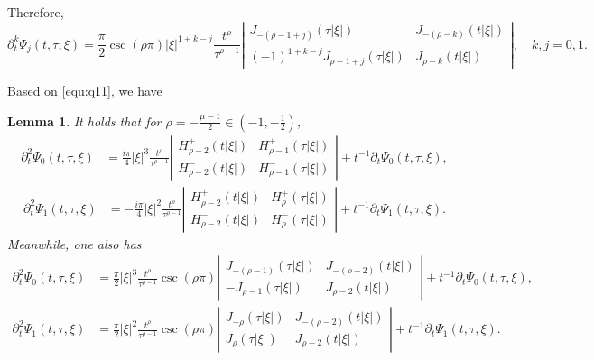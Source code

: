 \documentclass[11pt,twoside]{article}
\newcommand{\p}{\partial}
\newcommand{\f}{\frac}
\theoremstyle{plain}
\newtheorem{lemma}[theorem]{Lemma}
\theoremstyle{definition}
\theoremstyle{remark}
\numberwithin{equation}{section}
\begin{document}
Therefore,
\begin{equation}\label{equ:q11}
\partial_{t}^{k} \Psi_{j}(t, \tau, \xi)=\frac{\pi}{2} \csc  (\rho \pi)|\xi|^{1+k-j} \frac{t^{\rho}}{\tau^{\rho-1}}
 \left|\begin{array}{cc}
J_{-(\rho-1+j)}(\tau|\xi|) & J_{-(\rho-k)}(t|\xi|) \\
(-1)^{1+k-j} J_{\rho-1+j}(\tau|\xi|) & J_{\rho-k}(t|\xi|)
\end{array}\right|,\quad  k, j=0,1.
\end{equation}


Based on \eqref{equ:q11}, we have
\begin{lemma}\label{lem6}
It holds that for $\rho=-\f{\mu-1}{2}\in (-1, -\f12)$,
\begin{equation}\label{l-1}
\begin{aligned}
\p_t^2\Psi_{0}(t, \tau, \xi)& =\frac{i \pi}{4}|\xi|^3 \frac{t^{\rho}}{\tau^{\rho-1}}\left|\begin{array}{ll}
H_{\rho-2}^{+}(t|\xi|) & H_{\rho-1}^{+}(\tau|\xi|) \\
H_{\rho-2}^{-}(t|\xi|) & H_{\rho-1}^{-}(\tau|\xi|)
\end{array}\right|+ t^{-1}\p_t\Psi_{0}(t, \tau, \xi),
\end{aligned}
\end{equation}
\begin{equation}\label{l-2}
\begin{aligned}
\p_t^2\Psi_{1}(t, \tau, \xi)& =-\frac{i \pi}{4}|\xi|^2 \frac{t^{\rho}}{\tau^{\rho-1}}\left|\begin{array}{ll}
H_{\rho-2}^{+}(t|\xi|) & H_{\rho}^{+}(\tau|\xi|) \\
H_{\rho-2}^{-}(t|\xi|) & H_{\rho}^{-}(\tau|\xi|)
\end{array}\right|+ t^{-1}\p_t\Psi_{1}(t, \tau, \xi).
\end{aligned}
\end{equation}
Meanwhile, one also has
\begin{equation}\label{l-3}
\begin{aligned}
\p_t^2\Psi_{0}(t, \tau, \xi)
& =\frac{\pi}{2}|\xi|^3 \frac{t^{\rho}}{\tau^{\rho-1}}\csc(\rho\pi)\left|\begin{array}{ll}
J_{-(\rho-1)}(\tau|\xi|) & J_{-(\rho-2)}(t|\xi|) \\
-J_{\rho-1}(\tau|\xi|) & J_{\rho-2}(t|\xi|)
\end{array}\right|+ t^{-1}\p_t\Psi_{0}(t, \tau, \xi),
\end{aligned}
\end{equation}
\begin{equation}\label{l-4}
\begin{aligned}
\p_t^2\Psi_{1}(t, \tau, \xi)
& =\frac{ \pi}{2}|\xi|^2 \frac{t^{\rho}}{\tau^{\rho-1}}\csc(\rho\pi)\left|\begin{array}{ll}
J_{-\rho}(\tau|\xi|) & J_{-(\rho-2)}(t|\xi|) \\
J_{\rho}(\tau|\xi|) & J_{\rho-2}(t|\xi|)
\end{array}\right|+ t^{-1}\p_t\Psi_{1}(t, \tau, \xi).
\end{aligned}
\end{equation}
\end{lemma}
\end{document}
